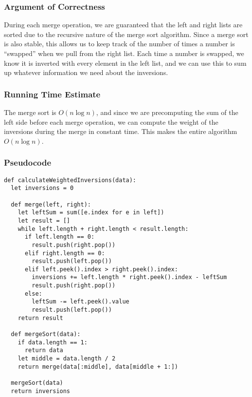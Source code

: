 \documentclass{math}
\begin{document}
\subsubsection*{Argument of Correctness}
During each merge operation, we are guaranteed that the left and right lists
are sorted due to the recursive nature of the merge sort algorithm. Since a
merge sort is also stable, this allows us to keep track of the number of times
a number is ``swapped'' when we pull from the right list. Each time a number
is swapped, we know it is inverted with every element in the left list, and
we can use this to sum up whatever information we need about the inversions.

\subsubsection*{Running Time Estimate}
The merge sort is \( O(n\log n) \), and since we are precomputing the
sum of the left side before each merge operation, we can compute the weight
of the inversions during the merge in constant time. This makes the entire
algorithm \( O(n\log n) \).

\subsubsection*{Pseudocode}
\begin{lstlisting}
def calculateWeightedInversions(data):
  let inversions = 0

  def merge(left, right):
    let leftSum = sum([e.index for e in left])
    let result = []
    while left.length + right.length < result.length:
      if left.length == 0:
        result.push(right.pop())
      elif right.length == 0:
        result.push(left.pop())
      elif left.peek().index > right.peek().index:
        inversions += left.length * right.peek().index - leftSum
        result.push(right.pop())
      else:
        leftSum -= left.peek().value
        result.push(left.pop())
    return result

  def mergeSort(data):
    if data.length == 1:
      return data
    let middle = data.length / 2
    return merge(data[:middle], data[middle + 1:])

  mergeSort(data)
  return inversions
\end{lstlisting}
\end{document}
